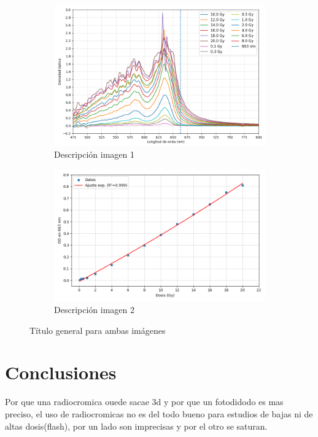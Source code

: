 \documentclass[onecolumn,12pt]{article} %
\begin{document}
\begin{figure}[H]
    \centering
    \begin{subfigure}[b]{0.5\textwidth}
        \centering
        \includegraphics[width=\textwidth]{img_Esp/663.png}
        \caption{Descripción imagen 1}
        \label{fig:img1}
    \end{subfigure}
    \hfill
    \begin{subfigure}[b]{0.5\textwidth}
        \centering
        \includegraphics[width=\textwidth]{img_Esp/663Calib.png}
        \caption{Descripción imagen 2}
        \label{fig:img2}
    \end{subfigure}
    \caption{Título general para ambas imágenes}
    \label{fig:ambas}
\end{figure}




\section{Conclusiones}
Por que una radiocromica ouede sacae 3d y por que un fotodidodo es mas preciso, 
el uso de radiocromicas no es del todo bueno para estudios de bajas ni de altas dosis(flash), por un lado son imprecisas y por el otro se saturan. 

\end{document}
